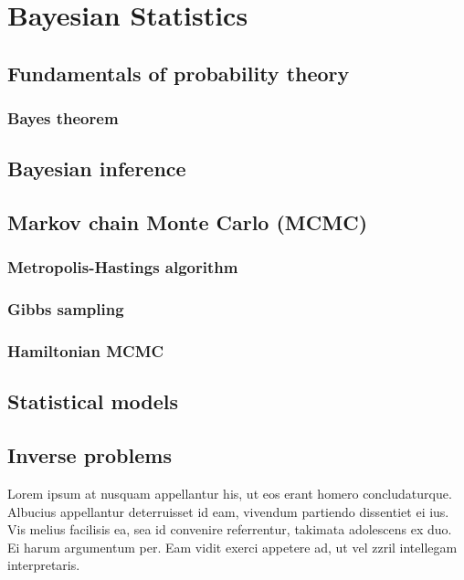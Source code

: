 
\chapter{Bayesian Statistics}\label{ch:stats}

\section{Fundamentals of probability theory}
\subsection{Bayes theorem}

\section{Bayesian inference}

\section{Markov chain Monte Carlo (MCMC)}
\subsection{Metropolis-Hastings algorithm}
\subsection{Gibbs sampling}
\subsection{Hamiltonian MCMC}

\section{Statistical models}

\section{Inverse problems}

Lorem ipsum at nusquam appellantur his, ut eos erant homero
concludaturque. Albucius appellantur deterruisset id eam, vivendum
partiendo dissentiet ei ius. Vis melius facilisis ea, sea id convenire
referrentur, takimata adolescens ex duo. Ei harum argumentum per. Eam
vidit exerci appetere ad, ut vel zzril intellegam interpretaris.

